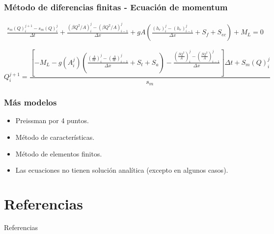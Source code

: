 \documentclass[17pt, t, lualatex]{beamer}
\begin{document}
\begin{frame}
  \frametitle{Método de diferencias finitas - Ecuación de momentum}

  \begin{align*}
  \frac{s_{m} (Q)_{i}^{j+1} - s_{m}(Q)_{i}^{j} }{\Delta t} + \frac{(\beta Q^{2}/A)_{i}^{j} - (\beta Q^{2} /A)_{i-1}^{j} }{\Delta x} + gA \left( \frac{(h_{r})_{i}^{j} - (h_{r})_{i-1}^{j}}{\Delta x} + S_{f} + S_{ec}   \right) + M_{L} = 0   
\end{align*}

  \[
  Q_{i}^{j+1} = \frac{\left[ -M_{L} - g(A_{i}^{j}) \left(\frac{\left(\frac{A}{W}\right)_{i}^{j} - \left(\frac{A}{W}\right)_{i-1}^{j} }{\Delta x} + S_{t} + S_{a}  \right) - \frac{ \left( \frac{\beta Q^{2}}{A} \right)_{i}^{j} - \left( \frac{\beta Q^{2}}{A} \right)_{i-1}^{j}  }{\Delta x}           \right] \Delta t + S_{m} (Q)_{i}^{j}}{s_{m}}
  \]
  
  
\end{frame}


\begin{frame}
  \frametitle{Más modelos}

  \begin{itemize}
    \item Preissman por 4 puntos.
    \item Método de características.
    \item Método de elementos finitos.
    \item Las ecuaciones no tienen solución analítica (excepto en algunos casos).\cite{deaton1999dynamic}
  \end{itemize}
  
\end{frame}
   





\section{Referencias}

\insertsectionpage
\begin{frame}[allowframebreaks]{Referencias}
  \printbibliography
\end{frame}


\insertendpage
\end{document}
